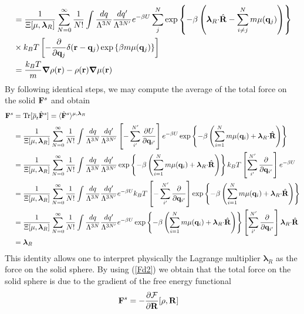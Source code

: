 \documentclass[b5paper,openright,10pt]{book}
\begin{document}
\begin{appendices}
\begin{align}
&=
\frac{1}{\Xi[\mu,\boldsymbol{\lambda}_R]}
 \sum_{N=0}^\infty \frac{1}{N!}
\int \frac{dq}{\Lambda^{3N}}\frac{dq'}{\Lambda^{3N'}}
e^{-\beta U}
\sum^{N}_{j}\exp\left\{-\beta  \left( \boldsymbol{\lambda}_R{\cdot}\hat{\bf R}
-\sum_{i\neq j}^N m\mu({\bf   q}_j)\right)\right\}
\nonumber\\
&\times k_BT\left[-\frac{\partial }{\partial {\bf q}_{j}}\delta({\bf r}-{\bf q}_j)
\exp\left\{\beta   m\mu({\bf   q}_j)\right\}\right]
\nonumber\\
&=\frac{k_BT}{m}\boldsymbol{\nabla} \rho({\bf r})
-\rho({\bf r})\boldsymbol{\nabla}\mu({\bf r})
\label{fllr}
\end{align}
By following identical steps, we may compute the average of the total force on the solid ${\bf F}^s$
and obtain
\begin{align}
{\bf F}^s&={\rm Tr}[\overline{\rho}_t \hat{\bf F}^s]=
 \langle \hat{\bf F}^s\rangle^{\mu,\boldsymbol{\lambda}_R} 
\nonumber\\
&=\frac{1}{\Xi[\mu,\boldsymbol{\lambda}_R]}
 \sum_{N=0}^\infty \frac{1}{N!}
\int \frac{dq}{\Lambda^{3N}}\frac{dq'}{\Lambda^{3N'}}
\left[-\sum^{N'}_{i'}\frac{\partial U}{\partial {\bf q}_{i'}}\right]
e^{-\beta U}
\exp\left\{-\beta  \left(\sum_{i=1}^N m\mu({\bf
    q}_i)+ \boldsymbol{\lambda}_R{\cdot}\hat{\bf R}\right)\right\}
\nonumber\\
&=
\frac{1}{\Xi[\mu,\boldsymbol{\lambda}_R]}
 \sum_{N=0}^\infty \frac{1}{N!}
\int \frac{dq}{\Lambda^{3N}}\frac{dq'}{\Lambda^{3N'}}
\exp\left\{-\beta  \left(\sum_{i=1}^N m\mu({\bf
    q}_i)+ \boldsymbol{\lambda}_R{\cdot}\hat{\bf R}\right)\right\}
k_BT\left[\sum^{N'}_{i'}\frac{\partial }{\partial {\bf q}_{i'}}\right]e^{-\beta U}
\nonumber\\
&=
\frac{1}{\Xi[\mu,\boldsymbol{\lambda}_R]}
 \sum_{N=0}^\infty \frac{1}{N!}
\int \frac{dq}{\Lambda^{3N}}\frac{dq'}{\Lambda^{3N'}}
e^{-\beta U}
k_BT\left[-\sum^{N'}_{i'}\frac{\partial }{\partial {\bf q}_{i'}}\right]\exp\left\{-\beta  \left(\sum_{i=1}^N m\mu({\bf
    q}_i)+ \boldsymbol{\lambda}_R{\cdot}\hat{\bf R}\right)\right\}
\nonumber\\
&=
\frac{1}{\Xi[\mu,\boldsymbol{\lambda}_R]}
 \sum_{N=0}^\infty \frac{1}{N!}
\int \frac{dq}{\Lambda^{3N}}\frac{dq'}{\Lambda^{3N'}}
e^{-\beta U}
\exp\left\{-\beta  \left(\sum_{i=1}^N m\mu({\bf
    q}_i)+ \boldsymbol{\lambda}_R{\cdot}\hat{\bf R}\right)\right\}
\left[\sum^{N'}_{i'}\frac{\partial }{\partial {\bf q}_{i'}}\right] \boldsymbol{\lambda}_R{\cdot}\hat{\bf R}
\nonumber\\
&=\boldsymbol{\lambda}_R
\label{lf}\end{align}
This  identity  allows  one  to  interpret  physically  the  Lagrange
multiplier $\boldsymbol{\lambda}_R$ as the  force on the solid sphere.
By  using (\ref{Fd2})  we obtain  that the  total force  on the  solid
sphere is due to the gradient of the free energy functional
\begin{align}
{\bf F}^s&=-\frac{\partial  {\cal F}}{\partial{\bf R}}[\rho,{\bf R}]
\label{Fls}
\end{align}


\end{appendices}
\end{document}
